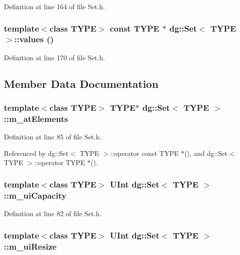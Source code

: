 Definition at line 164 of file Set.h.
\subsubsection{\setlength{\rightskip}{0pt plus 5cm}template$<$class TYPE$>$ const TYPE $\ast$ dg::Set$<$ TYPE $>$::values ()\hspace{0.3cm}{\tt  [inline]}}\label{classdg_1_1Set_a7}




Definition at line 170 of file Set.h.

\subsection{Member Data Documentation}
\subsubsection{\setlength{\rightskip}{0pt plus 5cm}template$<$class TYPE$>$ TYPE$\ast$ dg::Set$<$ TYPE $>$::m\_\-at\-Elements\hspace{0.3cm}{\tt  [protected]}}\label{classdg_1_1Set_n3}




Definition at line 85 of file Set.h.

Referenced by dg::Set$<$ TYPE $>$::operator const TYPE $\ast$(), and dg::Set$<$ TYPE $>$::operator TYPE $\ast$().
\subsubsection{\setlength{\rightskip}{0pt plus 5cm}template$<$class TYPE$>$ {\bf UInt} dg::Set$<$ TYPE $>$::m\_\-ui\-Capacity\hspace{0.3cm}{\tt  [protected]}}\label{classdg_1_1Set_n0}




Definition at line 82 of file Set.h.
\subsubsection{\setlength{\rightskip}{0pt plus 5cm}template$<$class TYPE$>$ {\bf UInt} dg::Set$<$ TYPE $>$::m\_\-ui\-Resize\hspace{0.3cm}{\tt  [protected]}}\label{classdg_1_1Set_n1}




